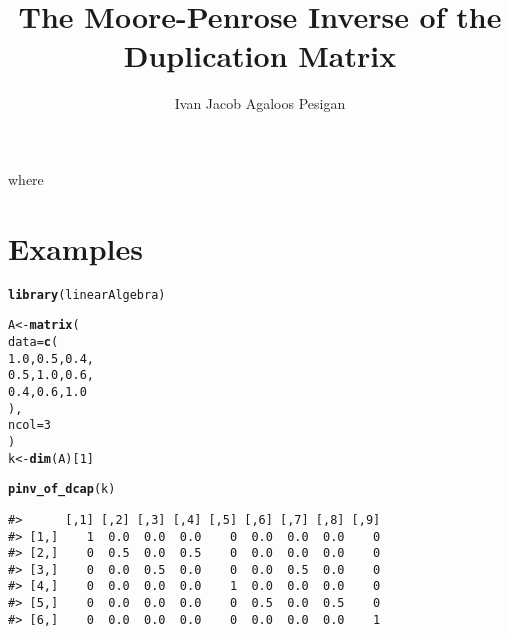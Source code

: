 \documentclass{article}\usepackage[]{graphicx}\usepackage[]{color}
\title{The Moore-Penrose Inverse of the Duplication Matrix}
\author{Ivan Jacob Agaloos Pesigan}
\date{}
\makeatletter
\newcommand{\hlnum}[1]{\textcolor[rgb]{0.686,0.059,0.569}{#1}}%
\newcommand{\hlstd}[1]{\textcolor[rgb]{0.345,0.345,0.345}{#1}}%
\newcommand{\hlkwb}[1]{\textcolor[rgb]{0.69,0.353,0.396}{#1}}%
\newcommand{\hlkwc}[1]{\textcolor[rgb]{0.333,0.667,0.333}{#1}}%
\newcommand{\hlkwd}[1]{\textcolor[rgb]{0.737,0.353,0.396}{\textbf{#1}}}%
\newenvironment{kframe}{%
 \def\at@end@of@kframe{}%
 \ifinner\ifhmode%
  \def\at@end@of@kframe{\end{minipage}}%
  \begin{minipage}{\columnwidth}%
 \fi\fi%
 \def\FrameCommand##1{\hskip\@totalleftmargin \hskip-\fboxsep
 \colorbox{shadecolor}{##1}\hskip-\fboxsep
     \hskip-\linewidth \hskip-\@totalleftmargin \hskip\columnwidth}%
 \MakeFramed {\advance\hsize-\width
   \@totalleftmargin\z@ \linewidth\hsize
   \@setminipage}}%
 {\par\unskip\endMakeFramed%
 \at@end@of@kframe}
\newenvironment{knitrout}{}{} %
\makeatother
\begin{document}
\maketitle









\noindent where





\newpage

\section*{Examples}

\begin{knitrout}
\color{fgcolor}\begin{kframe}
\begin{alltt}
\hlkwd{library}\hlstd{(linearAlgebra)}
\end{alltt}
\end{kframe}
\end{knitrout}


\begin{knitrout}
\color{fgcolor}\begin{kframe}
\begin{alltt}
\hlstd{A} \hlkwb{<-} \hlkwd{matrix}\hlstd{(}
  \hlkwc{data} \hlstd{=} \hlkwd{c}\hlstd{(}
    \hlnum{1.0}\hlstd{,} \hlnum{0.5}\hlstd{,} \hlnum{0.4}\hlstd{,}
    \hlnum{0.5}\hlstd{,} \hlnum{1.0}\hlstd{,} \hlnum{0.6}\hlstd{,}
    \hlnum{0.4}\hlstd{,} \hlnum{0.6}\hlstd{,} \hlnum{1.0}
  \hlstd{),}
  \hlkwc{ncol} \hlstd{=} \hlnum{3}
\hlstd{)}
\hlstd{k} \hlkwb{<-} \hlkwd{dim}\hlstd{(A)[}\hlnum{1}\hlstd{]}
\end{alltt}
\end{kframe}
\end{knitrout}

\begin{knitrout}
\color{fgcolor}\begin{kframe}
\begin{alltt}
\hlkwd{pinv_of_dcap}\hlstd{(k)}
\end{alltt}
\begin{verbatim}
#>      [,1] [,2] [,3] [,4] [,5] [,6] [,7] [,8] [,9]
#> [1,]    1  0.0  0.0  0.0    0  0.0  0.0  0.0    0
#> [2,]    0  0.5  0.0  0.5    0  0.0  0.0  0.0    0
#> [3,]    0  0.0  0.5  0.0    0  0.0  0.5  0.0    0
#> [4,]    0  0.0  0.0  0.0    1  0.0  0.0  0.0    0
#> [5,]    0  0.0  0.0  0.0    0  0.5  0.0  0.5    0
#> [6,]    0  0.0  0.0  0.0    0  0.0  0.0  0.0    1
\end{verbatim}
\end{kframe}
\end{knitrout}
\end{document}

